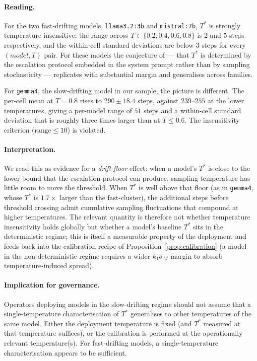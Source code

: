 \documentclass[11pt]{article}
\newcommand{\Tstar}{T^*}
\begin{document}


\paragraph{Reading.}
For the two fast-drifting models, \texttt{llama3.2:3b} and
\texttt{mistral:7b}, $\Tstar$ is strongly temperature-insensitive:
the range across $T \in \{0.2, 0.4, 0.6, 0.8\}$ is $2$ and $5$ steps
respectively, and the within-cell standard deviations are below
$3$ steps for every $(model, T)$ pair. For these models the conjecture
of \citep{fernandez2026applied} --- that $\Tstar$ is determined by the
escalation protocol embedded in the system prompt rather than by
sampling stochasticity --- replicates with substantial margin and
generalises across families.

For \texttt{gemma4}, the slow-drifting model in our sample, the
picture is different. The per-cell mean at $T = 0.8$ rises to
$290 \pm 18.4$ steps, against $239$--$255$ at the lower temperatures,
giving a per-model range of $51$ steps and a within-cell standard
deviation that is roughly three times larger than at $T \le 0.6$.
The insensitivity criterion ($\text{range} \le 10$) is violated.

\paragraph{Interpretation.}
We read this as evidence for a \emph{drift-floor} effect: when a
model's $\Tstar$ is close to the lower bound that the escalation
protocol can produce, sampling temperature has little room to move
the threshold. When $\Tstar$ is well above that floor (as in
\texttt{gemma4}, whose $\Tstar$ is $1.7\times$ larger than the
fast-cluster), the additional steps before threshold crossing
admit cumulative sampling fluctuations that compound at higher
temperatures. The relevant quantity is therefore not whether
temperature insensitivity holds globally but whether a model's
baseline $\Tstar$ sits in the deterministic regime; this is itself
a measurable property of the deployment and feeds back into the
calibration recipe of Proposition~\ref{prop:calibration} (a model
in the non-deterministic regime requires a wider $k_1 \sigma_M$
margin to absorb temperature-induced spread).

\paragraph{Implication for governance.}
Operators deploying models in the slow-drifting regime should not
assume that a single-temperature characterisation of $\Tstar$
generalises to other temperatures of the same model. Either the
deployment temperature is fixed (and $\Tstar$ measured at that
temperature suffices), or the calibration is performed at the
operationally relevant temperature(s). For fast-drifting models,
a single-temperature characterisation appears to be sufficient.
\end{document}
